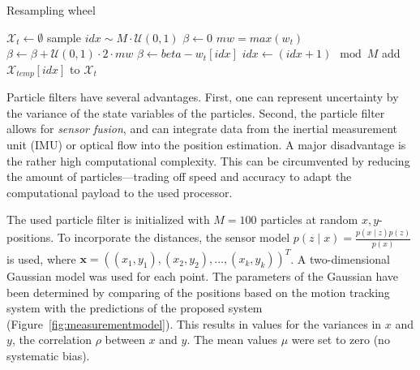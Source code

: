 \documentclass{report}
\begin{document}
\begin{algorithm}
\caption{Resampling wheel}
\label{alg:resampling_wheel}
  \begin{algorithmic}[1]
    \State $\mathcal{X}_t \gets \emptyset$
    \State sample $idx \sim M\cdot\mathcal{U}(0, 1)$
    \State $\beta \gets 0$
    \State $mw = max(w_t)$
    \State $\beta \gets \beta + \mathcal{U}(0, 1)\cdot 2\cdot mw$
    \State $\beta \gets beta - w_t[idx]$
    \State $idx \gets (idx + 1) \mod M$
    \EndWhile
    \State add $\mathcal{X}_{temp}[idx]$ to $\mathcal{X}_t$
    \EndFor
\EndProcedure
\end{algorithmic}
\end{algorithm}

Particle filters have several advantages. First, one can represent
uncertainty by the variance of the state variables of the
particles. Second, the particle filter allows for \emph{sensor
  fusion}, and can integrate data from the inertial measurement unit
(IMU) or optical flow into the position estimation. A major
disadvantage is the rather high computational complexity. This can be
circumvented by reducing the amount of particles---trading off speed
and accuracy to adapt the computational payload to the used processor.

The used particle filter is initialized with $M = 100$ particles at
random $x, y$-positions. To incorporate the distances, the sensor
model $p(z \mid x) = \frac{p(x \mid z)p(z)}{p(x)}$ is used, where
$\textbf{x} = ((x_1, y_1), (x_2, y_2), \ldots, (x_k, y_k))^T$. A
two-dimensional Gaussian model was used for each point. The parameters
of the Gaussian have been determined by comparing of the positions
based on the motion tracking system with the predictions of the
proposed system (Figure~\ref{fig:measurementmodel}). This results in
values for the variances in $x$ and $y$, the correlation $\rho$
between $x$ and $y$. The mean values $\mu$ were set to zero (no
systematic bias).
\end{document}
